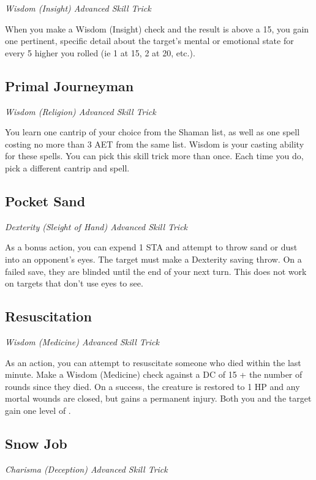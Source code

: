 \textit{Wisdom (Insight) Advanced Skill Trick}

When you make a Wisdom (Insight) check and the result is above a 15, you gain one pertinent, specific detail about the target's mental or emotional state for every 5 higher you rolled (ie 1 at 15, 2 at 20, etc.).

\subsection{Primal Journeyman}

\textit{Wisdom (Religion) Advanced Skill Trick}

You learn one cantrip of your choice from the Shaman list, as well as one spell costing no more than 3 AET from the same list. Wisdom is your casting ability for these spells. You can pick this skill trick more than once. Each time you do, pick a different cantrip and spell.

\subsection{Pocket Sand}

\textit{Dexterity (Sleight of Hand) Advanced Skill Trick}

As a bonus action, you can expend 1 STA and attempt to throw sand or dust into an opponent's eyes. The target must make a Dexterity saving throw. On a failed save, they are blinded until the end of your next turn. This does not work on targets that don't use eyes to see.

\subsection{Resuscitation}

\textit{Wisdom (Medicine) Advanced Skill Trick}

As an action, you can attempt to resuscitate someone who died within the last minute. Make a Wisdom (Medicine) check against a DC of 15 + the number of rounds since they died. On a success, the creature is restored to 1 HP and any mortal wounds are closed, but gains a permanent injury. Both you and the target gain one level of . 

\subsection{Snow Job}

\textit{Charisma (Deception) Advanced Skill Trick}


